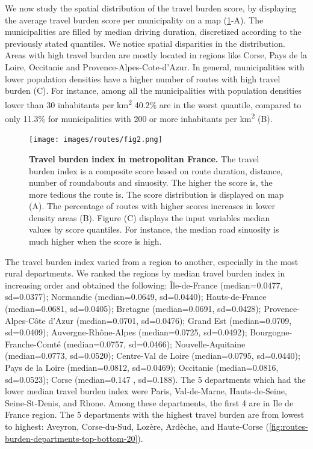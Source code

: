 We now study the spatial distribution of the travel burden score, by displaying
the average travel burden score per municipality on a map
(\cref{fig:routes-burden-index}-A). The municipalities are filled by median
driving duration, discretized according to the previously stated quantiles.
We notice spatial disparities in the distribution. Areas with high travel
burden are mostly located in regions like Corse, Pays de la Loire, Occitanie
and Provence-Alpes-Cote-d'Azur. In general, municipalities with lower
population densities have a higher number of routes with high travel burden (C).
For instance, among all the municipalities with population densities lower than
30 inhabitants per km\textsuperscript{2} 40.2\% are in the worst quantile,
compared to only 11.3\% for municipalities with 200 or more inhabitants per
km\textsuperscript{2} (B).

\begin{figure}[h!]
    \texttt{[image: images/routes/fig2.png]}
    \centering
    \caption{
        \textbf{Travel burden index in metropolitan France.}
        The travel burden index is a composite score based on route duration,
        distance, number of roundabouts and sinuosity. The higher the score is,
        the more tedious the route is. The score distribution is displayed on
        map (A). The percentage of routes with higher scores increases in lower
        density areas (B). Figure (C) displays the input variables median values
        by score quantiles. For instance, the median road sinuosity is much
        higher when the score is high. }
    \label{fig:routes-burden-index}
\end{figure}

The travel burden index varied from a region to another, especially in the most
rural departments. We ranked the regions by median travel burden index in
increasing order and obtained the following: Île-de-France (median=0.0477,
sd=0.0377); Normandie (median=0.0649, sd=0.0440); Hauts-de-France
(median=0.0681, sd=0.0405); Bretagne (median=0.0691, sd=0.0428);
Provence-Alpes-Côte d'Azur (median=0.0701, sd=0.0476); Grand Est (median=0.0709,
sd=0.0409); Auvergne-Rhône-Alpes (median=0.0725, sd=0.0492);
Bourgogne-Franche-Comté (median=0.0757, sd=0.0466); Nouvelle-Aquitaine
(median=0.0773, sd=0.0520); Centre-Val de Loire (median=0.0795, sd=0.0440); Pays
de la Loire (median=0.0812, sd=0.0469); Occitanie (median=0.0816, sd=0.0523);
Corse (median=0.147 , sd=0.188). The 5 departments which had the lower median
travel burden index were Paris, Val-de-Marne, Hauts-de-Seine, Seine-St-Denis,
and Rhone. Among these departments, the first 4 are in Ile de France region. The
5 departments with the highest travel burden are from lowest to highest:
Aveyron, Corse-du-Sud, Lozère, Ardèche, and Haute-Corse
(\cref{fig:routes-burden-departments-top-bottom-20}).

